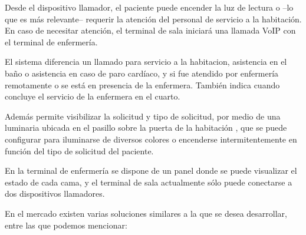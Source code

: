 Desde el dispositivo llamador, el paciente puede encender la luz de lectura o –lo que es más relevante– requerir la atención del personal de servicio a la habitación. En caso de necesitar atención, el terminal de sala iniciará una llamada VoIP con el terminal de enfermería.

El sistema diferencia un llamado para servicio a la habitacion, asistencia en el baño o asistencia en caso de paro cardíaco, y si fue atendido por enfermería remotamente o se está en presencia de la enfermera. También indica cuando concluye el servicio de la enfermera en el cuarto.

Además permite visibilizar la solicitud y tipo de solicitud, por medio de una luminaria ubicada en el pasillo sobre la puerta de la habitación , que se puede configurar para iluminarse de diversos colores o encenderse intermitentemente en función del tipo de solicitud del paciente.

En la terminal de enfermería se dispone de un panel donde se puede visualizar el estado de cada cama, y el terminal de sala actualmente sólo puede conectarse a dos dispositivos llamadores.

En el mercado existen varias soluciones similares a la que se desea desarrollar, entre las que podemos mencionar:

